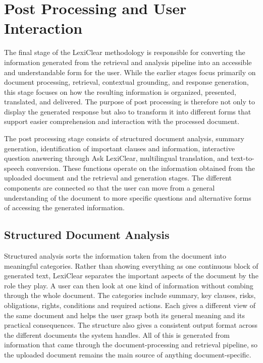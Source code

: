 \documentclass[12pt,a4paper,oneside]{report}
\begin{document}
\section{Post Processing and User Interaction}

The final stage of the LexiClear methodology is responsible for converting the information generated from the retrieval and analysis pipeline into an accessible and understandable form for the user. While the earlier stages focus primarily on document processing, retrieval, contextual grounding, and response generation, this stage focuses on how the resulting information is organized, presented, translated, and delivered. The purpose of post processing is therefore not only to display the generated response but also to transform it into different forms that support easier comprehension and interaction with the processed document.

The post processing stage consists of structured document analysis, summary generation, identification of important clauses and information, interactive question answering through Ask LexiClear, multilingual translation, and text-to-speech conversion. These functions operate on the information obtained from the uploaded document and the retrieval and generation stages. The different components are connected so that the user can move from a general understanding of the document to more specific questions and alternative forms of accessing the generated information.

\subsection{Structured Document Analysis}

Structured analysis sorts the information taken from the document into meaningful categories. Rather than showing everything as one continuous block of generated text, LexiClear separates the important aspects of the document by the role they play. A user can then look at one kind of information without combing through the whole document. The categories include summary, key clauses, risks, obligations, rights, conditions and required actions. Each gives a different view of the same document and helps the user grasp both its general meaning and its practical consequences. The structure also gives a consistent output format across the different documents the system handles. All of this is generated from information that came through the document-processing and retrieval pipeline, so the uploaded document remains the main source of anything document-specific.
\end{document}
